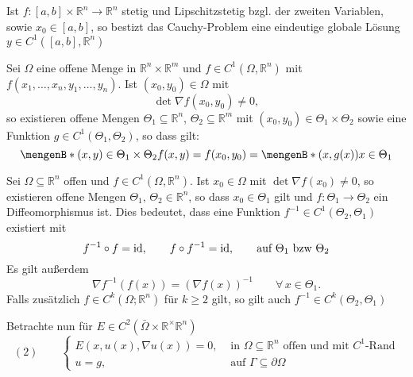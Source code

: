 \begin{bemerkung}
	Ist $f: [a,b] \times \mathbb{R}^n \to \mathbb{R}^n$ stetig und Lipschitzstetig bzgl. der zweiten Variablen, sowie $x_0 \in [a,b]$, so bestizt das Cauchy-Problem
	eine eindeutige globale Lösung $y \in C^1([a,b], \mathbb{R}^n)$
\end{bemerkung}

\begin{satz}
	Sei $\Omega$ eine offene Menge in $\mathbb{R}^n \times \mathbb{R}^m$ und $f \in C^1(\Omega, \mathbb{R}^n)$ mit $f(x_1,\dots,x_n,y_1, \dots, y_n)$. Ist $(x_0,y_0) \in \Omega$ mit 
	\[
		\det  \nabla f(x_0,y_0) \neq 0,
	\] 
	so existieren offene Mengen $\Theta_1 \subseteq \mathbb{R}^n $, $ \Theta_2 \subseteq \mathbb{R}^m$ mit $(x_0,y_0) \in \Theta_1 \times \Theta_2$ sowie eine
	Funktion $g \in C^1(\Theta_1, \Theta_2)$, so dass gilt:
	\[
		\set[(x,y) \in \Theta_1 \times \Theta_2]{f(x,y)=f(x_0,y_0)} = \set[(x,g(x))]{x \in \Theta_1}
	\]
\end{satz}

\begin{satz}
	Sei $\Omega \subseteq \mathbb{R}^n$ offen und $f \in C^1(\Omega,\mathbb{R}^n)$. Ist $x_0 \in \Omega$ mit $\det  \nabla f(x_0) \neq 0$, so existieren offene Mengen
	$\Theta_1, \, \Theta_2 \in \mathbb{R}^n$, so dass $x_0 \in \Theta_1$ gilt und $f: \Theta_1 \to \Theta_2$ ein Diffeomorphismus ist. Dies bedeutet, dass eine Funktion $f^{-1} \in C^1(\Theta_2, \Theta_1)$ existiert mit 
	\[
		f^{-1} \circ f = \operatorname{id}, \qquad f \circ f^{-1} = \operatorname{id}, \qquad \text{auf } \Theta_1 \text{ bzw } \Theta_2
	\]
	Es gilt außerdem 
	\[
		 \nabla f^{-1}(f(x)) = ( \nabla f(x))^{-1} \qquad \forall\, x \in \Theta_1.
	\]
	Falls zusätzlich $f \in C^k(\Omega; \mathbb{R}^n)$ für $k \geq 2$ gilt, so gilt auch $f ^{-1} \in C^k(\Theta_2,\Theta_1)$
 \end{satz}
Betrachte nun für $E \in C^2( \bar{\Omega} \times \mathbb{R}^ \times \mathbb{R}^n)$
\[
	(2) \qquad \begin{cases}
		E(x,u(x), \nabla u(x))=0, &\text{ in }\Omega \subseteq \mathbb{R}^n \text{ offen und mit $C^1$-Rand}\\
		u=g,&\text{ auf }\Gamma \subseteq \partial \Omega
	\end{cases}
\]
